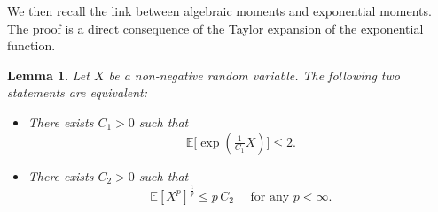 \documentclass[11pt,a4paper,oneside]{amsart}
\numberwithin{equation}{section}
\newtheorem{proposition}[theorem]{Proposition}
\newtheorem{lemma}[theorem]{Lemma}
\newcommand{\dd}{\mathrm{d}}
\newcommand{\nc}[1]{\textcolor{red}{[N: #1]}}
\begin{document}
We then recall the link between algebraic moments and exponential moments. The proof is a direct consequence of the Taylor expansion of the exponential function. 
%
\begin{lemma}\label{momentexp}Let $X$ be a non-negative random variable. The following two statements are equivalent: 
\begin{itemize}
\item[(i)]There exists $C_1>0$ such that 
%
$$\mathbb{E}\big[\exp(\tfrac{1}{C_1}X)\big]\leq 2.$$
%
\item[(ii)] There exists $C_2>0$ such that
%
$$\mathbb{E}[X^p]^{\frac{1}{p}}\leq p\,C_2\quad\text{ for any $p<\infty$}.$$
%
\end{itemize}
%
\end{lemma}
%
%

%
%
%
%
%
%
%
%
%
\end{document}
